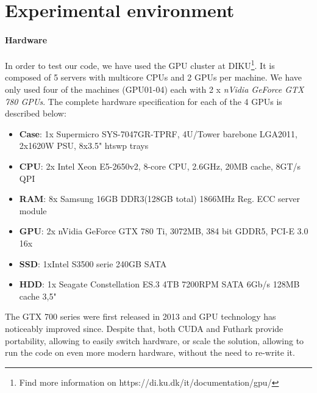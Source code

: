 
\section{Experimental environment}
\paragraph{Hardware}
In order to test our code, we have used the GPU cluster at DIKU\footnote{Find more information on https://di.ku.dk/it/documentation/gpu/}. It is composed of 5 servers with multicore CPUs and 2 GPUs per machine. We have only used four of the machines (GPU01-04) each with 2 x \textit{nVidia GeForce GTX 780 GPUs}. The complete hardware specification for each of the 4 GPUs is described below:
\begin{itemize}
\item \textbf{Case}: 1x Supermicro SYS-7047GR-TPRF, 4U/Tower barebone LGA2011, 2x1620W PSU, 8x3.5" htswp trays

\item \textbf{CPU}: 2x Intel Xeon E5-2650v2, 8-core CPU, 2.6GHz, 20MB cache, 8GT/s QPI

\item \textbf{RAM}: 8x Samsung 16GB DDR3(128GB total) 1866MHz Reg. ECC server module

\item \textbf{GPU}: 2x nVidia GeForce GTX 780 Ti, 3072MB, 384 bit GDDR5, PCI-E 3.0 16x

\item \textbf{SSD}: 1xIntel S3500 serie 240GB SATA

\item \textbf{HDD}: 1x	Seagate Constellation ES.3 4TB 7200RPM SATA 6Gb/s 128MB cache 3,5"
\end{itemize}

The GTX 700 series were first released in 2013 and GPU technology has noticeably improved since. Despite that, both CUDA and Futhark provide portability, allowing to easily switch hardware, or scale the solution, allowing to run the code on even more modern hardware, without the need to re-write it.




